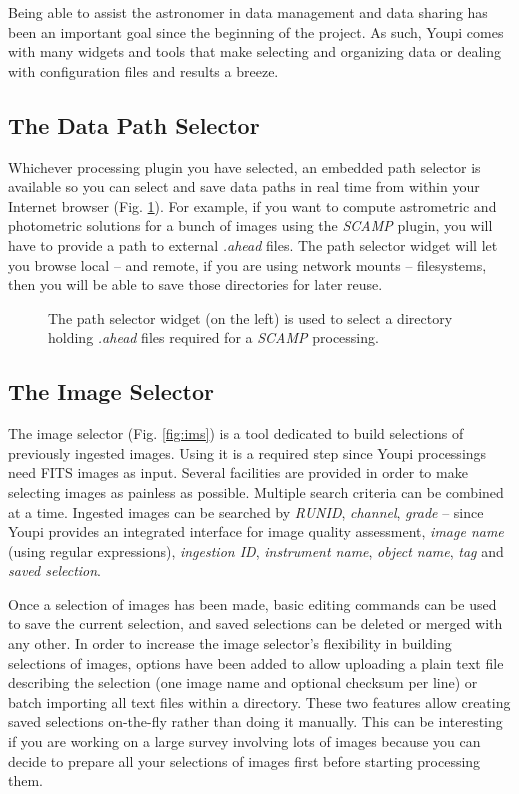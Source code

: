 \documentclass[11pt,twoside]{article}  %
\begin{document}
Being able to assist the astronomer in data management and data sharing has been an important 
goal since the beginning of the project. As such, Youpi comes with many widgets and tools that 
make selecting and organizing data or dealing with configuration files and results a breeze.

\subsection{The Data Path Selector}

Whichever processing plugin you have selected, an embedded path selector is available so you 
can select and save data paths in real time from within your Internet browser (Fig. \ref{fig:browser}).
For example, if you want to compute astrometric and photometric solutions for a bunch of images 
using the \emph{SCAMP} plugin, you will have to provide a path to external \emph{.ahead} files.
The path selector widget will let you browse local -- and remote, if you are using network mounts -- 
filesystems, then you will be able to save those directories for later reuse.

\begin{figure}[h]
\caption{The path selector widget (on the left) is used to select a directory holding \emph{.ahead} 
files required for a \emph{SCAMP} processing.}\label{fig:browser}
\end{figure}

\subsection{The Image Selector}\label{sec:ims}

The image selector (Fig. \ref{fig:ims}) is a tool dedicated to build selections of previously 
ingested images.  Using it is a required step since Youpi processings need FITS images as input. 
Several facilities are provided in order to make selecting images as painless as possible. 
Multiple search criteria can be combined at a time. Ingested images can be searched by \emph{RUNID}, 
\emph{channel}, \emph{grade} -- since Youpi provides an integrated interface for image 
quality assessment, \emph{image name} (using regular expressions), \emph{ingestion ID}, 
\emph{instrument name}, \emph{object name}, \emph{tag} and \emph{saved selection}.

Once a selection of images has been made, basic editing commands can be used to save the 
current selection, and saved selections can be deleted or merged with any other. In order 
to increase the image selector's flexibility in building selections of images, options have 
been added to allow uploading a plain text file describing the selection (one image name 
and optional checksum per line) or batch importing all text files within a directory. 
These two features allow creating saved selections on-the-fly rather than doing it manually.
This can be interesting if you are working on a large survey involving lots of images because
you can decide to prepare all your selections of images first before starting processing them.
\end{document}
